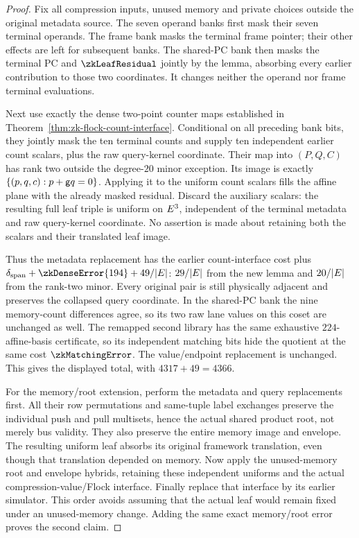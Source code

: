 \begin{proof}
Fix all compression inputs, unused memory and private choices outside the original metadata source. The seven operand banks first mask their seven terminal operands. The frame bank masks the terminal frame pointer; their other effects are left for subsequent banks. The shared-PC bank then masks the terminal PC and $\zkLeafResidual$ jointly by the lemma, absorbing every earlier contribution to those two coordinates. It changes neither the operand nor frame terminal evaluations.

Next use exactly the dense two-point counter maps established in Theorem~\ref{thm:zk-flock-count-interface}. Conditional on all preceding bank bits, they jointly mask the ten terminal counts and supply ten independent earlier count scalars, plus the raw query-kernel coordinate. Their map into $(P,Q,C)$ has rank two outside the degree-$20$ minor exception. Its image is exactly $\{(p,q,c):p+\mathsf{g} q=0\}$. Applying it to the uniform count scalars fills the affine plane with the already masked residual. Discard the auxiliary scalars: the resulting full leaf triple is uniform on $E^3$, independent of the terminal metadata and raw query-kernel coordinate. No assertion is made about retaining both the scalars and their translated leaf image.

Thus the metadata replacement has the earlier count-interface cost plus $\delta_{\mathrm{span}}+\zkDenseError{194}+49/|\E|$: $29/|E|$ from the new lemma and $20/|E|$ from the rank-two minor. Every original pair is still physically adjacent and preserves the collapsed query coordinate. In the shared-PC bank the nine memory-count differences agree, so its two raw lane values on this coset are unchanged as well. The remapped second library has the same exhaustive $224$-affine-basis certificate, so its independent matching bits hide the quotient at the same cost $\zkMatchingError$. The value/endpoint replacement is unchanged. This gives the displayed total, with $4317+49=4366$.

For the memory/root extension, perform the metadata and query replacements first. All their row permutations and same-tuple label exchanges preserve the individual push and pull multisets, hence the actual shared product root, not merely bus validity. They also preserve the entire memory image and envelope. The resulting uniform leaf absorbs its original framework translation, even though that translation depended on memory. Now apply the unused-memory root and envelope hybrids, retaining these independent uniforms and the actual compression-value/Flock interface. Finally replace that interface by its earlier simulator. This order avoids assuming that the actual leaf would remain fixed under an unused-memory change. Adding the same exact memory/root error proves the second claim.
\end{proof}

